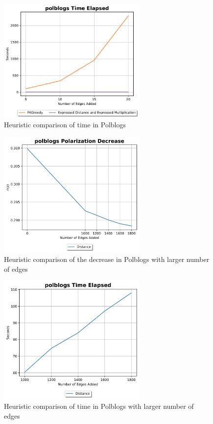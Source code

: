 \begin{figure}[H]
	\centering
	\includegraphics[width=0.65\textwidth]{Figures/polblogs Time Elapsed}
	\caption{Heuristic comparison of time in Polblogs}
	\label{fig:polblogs_time}
\end{figure}

\clearpage

\begin{figure}[H]
	\centering
	\includegraphics[width=0.65\textwidth]{Figures/polblogs Polarization Decrease 2}
	\caption{Heuristic comparison of the decrease in Polblogs with larger number of edges}
	\label{fig:polblogs2_pol}
\end{figure}


\begin{figure}[H]
	\centering
	\includegraphics[width=0.65\textwidth]{Figures/polblogs Time Elapsed 2}
	\caption{Heuristic comparison of time in Polblogs with larger number of edges}
	\label{fig:polblogs2_time}
\end{figure}


